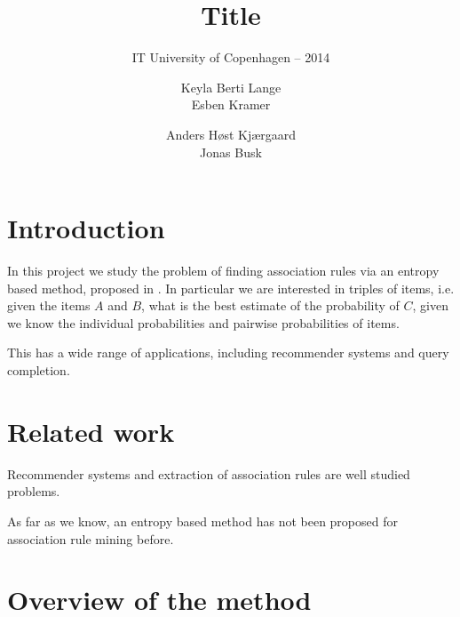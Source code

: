 \documentclass{acm_proc_article-sp}
\begin{document}
\title{Title}
\subtitle{IT University of Copenhagen -- 2014}

\author{
\alignauthor
Keyla Berti Lange\\
\alignauthor
Esben Kramer\\
\and
\alignauthor
Anders H{\o}st Kj{\ae}rgaard\\
\alignauthor
Jonas Busk\\
}

\maketitle

\begin{abstract}
\end{abstract}

\section{Introduction}

In this project we study the problem of finding association rules via an entropy based method, proposed in \cite{rasmus}. In particular we are interested in triples of items, i.e. given the items $A$ and $B$, what is the best estimate of the probability of $C$, given we know the individual probabilities and pairwise probabilities of items. 

This has a wide range of applications, including recommender systems and query completion. 

\section{Related work}

Recommender systems and extraction of association rules are well studied problems. 

As far as we know, an entropy based method has not been proposed for association rule mining before. 

\section{Overview of the method}
\end{document}
